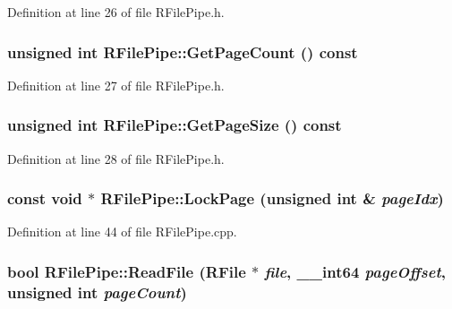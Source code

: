 Definition at line 26 of file RFilePipe.h.\hypertarget{class_r_file_pipe_c943bb0bd586208d1f031e020bca5750}{
\subsubsection[{GetPageCount}]{\setlength{\rightskip}{0pt plus 5cm}unsigned int RFilePipe::GetPageCount () const}}
\label{class_r_file_pipe_c943bb0bd586208d1f031e020bca5750}




Definition at line 27 of file RFilePipe.h.\hypertarget{class_r_file_pipe_d868c745a9faf08017e716e4e823378e}{
\subsubsection[{GetPageSize}]{\setlength{\rightskip}{0pt plus 5cm}unsigned int RFilePipe::GetPageSize () const}}
\label{class_r_file_pipe_d868c745a9faf08017e716e4e823378e}




Definition at line 28 of file RFilePipe.h.\hypertarget{class_r_file_pipe_73f40320bff78dd2131dff47118a6b61}{
\subsubsection[{LockPage}]{\setlength{\rightskip}{0pt plus 5cm}const void $\ast$ RFilePipe::LockPage (unsigned int \& {\em pageIdx})}}
\label{class_r_file_pipe_73f40320bff78dd2131dff47118a6b61}




Definition at line 44 of file RFilePipe.cpp.\hypertarget{class_r_file_pipe_4839f26e007142a7cbfabc765226671f}{
\subsubsection[{ReadFile}]{\setlength{\rightskip}{0pt plus 5cm}bool RFilePipe::ReadFile ({\bf RFile} $\ast$ {\em file}, \/  {\bf \_\-\_\-int64} {\em pageOffset}, \/  unsigned int {\em pageCount})}}
\label{class_r_file_pipe_4839f26e007142a7cbfabc765226671f}




